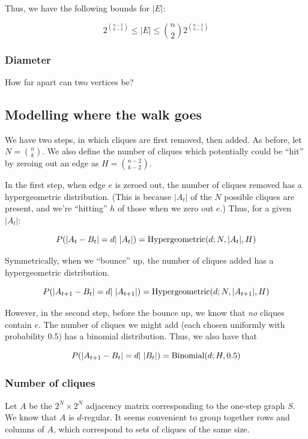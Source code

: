 \documentclass[12pt]{article}
\theoremstyle{definition}
\begin{document}
Thus, we have the following bounds for $|E|$:

\[
2^{{n-2} \choose {k-2}} \le |E| \le {n \choose 2} 2^{{n-2} \choose {k-2}}
\]

\subsubsection{Diameter}

How far apart can two vertices be?

\subsection{Modelling where the walk goes}

We have two steps, in which cliques are first removed, then added.
As before, let $N = {n \choose k}$.
We also define the number of cliques which potentially could be ``hit'' by
zeroing out an edge as $H = {{n-2} \choose {k-2}}$.

In the first step, when edge $e$ is zeroed out, the number of cliques removed has
a hypergeometric distribution. (This is because $|A_t|$ of the $N$ possible cliques
are present, and we're ``hitting'' $h$ of those when we zero out $e$.)
Thus, for a given $|A_t|$:

\[
P(|A_t - B_t|=d|\hspace{1mm}|A_t|) = \text{Hypergeometric}(d; N, |A_t|, H)
\]

Symmetrically, when we ``bounce'' up, the number of cliques added has
a hypergeometric distribution.

\[
P(|A_{t+1} - B_t|=d|\hspace{1mm}|A_{t+1}|) = \text{Hypergeometric}(d; N, |A_{t+1}|, H)
\]

However, in the second step, before the bounce up, we know that {\em no} cliques contain $e$. The number of
cliques we might add (each chosen uniformly with probability 0.5) has 
a binomial distribution. Thus, we also have that

\[
P(|A_{t+1} - B_t|=d|\hspace{1mm}|B_t|) = \text{Binomial}(d; H, 0.5)
\]

\subsubsection{Number of cliques}

Let $A$ be the $2^N{\times}2^N$ adjacency matrix corresponding to the one-step graph $S$.
We know that $A$ is $d$-regular.
It seems convenient to group together rows and columns of $A$,
which correspond to sets of cliques of the same size.
\end{document}
